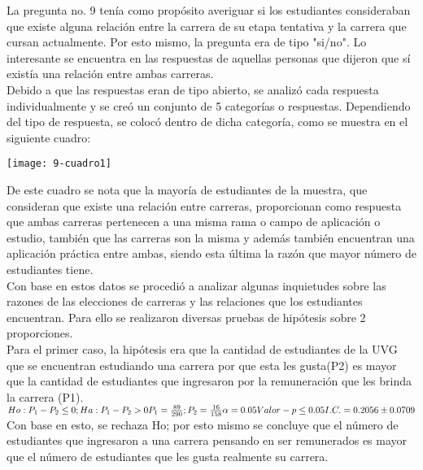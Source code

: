 La pregunta no. 9 tenía como propósito averiguar si los estudiantes consideraban que existe alguna relación entre la carrera de su etapa tentativa y la carrera que cursan actualmente. Por esto mismo, la pregunta era de tipo "si/no". Lo interesante se encuentra en las respuestas de aquellas personas que dijeron que sí existía una relación entre ambas carreras. \\

Debido a que las respuestas eran de tipo abierto, se analizó cada respuesta individualmente y se creó un conjunto de 5 categorías o respuestas. Dependiendo del tipo de respuesta, se colocó dentro de dicha categoría, como se muestra en el siguiente cuadro: 

\begin{center}
	\texttt{[image: 9-cuadro1]}
\end{center}

De este cuadro se nota que la mayoría de estudiantes de la muestra, que consideran que existe una relación entre carreras, proporcionan como respuesta que ambas carreras pertenecen a una misma rama o campo de aplicación o estudio, también que las carreras son la misma y además también encuentran una aplicación práctica entre ambas, siendo esta última la razón que mayor número de estudiantes tiene. \\

Con base en estos datos se procedió a analizar algunas inquietudes sobre las razones de las elecciones de carreras y las relaciones que los estudiantes encuentran. Para ello se realizaron diversas pruebas de hipótesis sobre 2 proporciones. \\

Para el primer caso, la hipótesis era que la cantidad de estudiantes de la UVG que se encuentran estudiando una carrera por que esta les gusta(P2) es mayor que la cantidad de estudiantes que ingresaron por la remuneración que les brinda la carrera (P1).\\

\begin{math}
	Ho: P_{1} - P_{2} \leq 0; 
	Ha: P_{1} - P_{2} > 0 \\
	P_{1} = \frac{89}{290}; P_{2} = \frac{16}{158} \\
	\alpha = 0.05\\
	Valor-p\leq 0.05\\
	I.C.= 0.2056 \pm 0.0709\\
\end{math}
\\
Con base en esto, se rechaza Ho; por esto mismo se concluye que el número de estudiantes que ingresaron a una carrera pensando en ser remunerados es mayor que el número de estudiantes que les gusta realmente su carrera. \\

